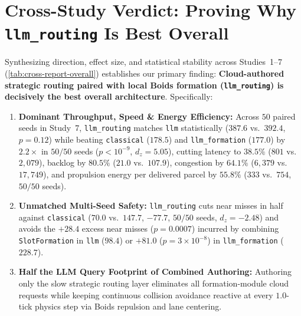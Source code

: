 \documentclass[11pt,a4paper,oneside]{report}
\begin{document}
\section[Why LLM Routing Wins Overall]{Cross-Study Verdict: Proving Why \texttt{llm\_routing} Is Best Overall}
Synthesizing direction, effect size, and statistical stability across Studies~1--7 (\autoref{tab:cross-report-overall}) establishes our primary finding: \textbf{Cloud-authored strategic routing paired with local Boids formation (\texttt{llm\_routing}) is decisively the best overall architecture}. Specifically:
\begin{enumerate}
    \item \textbf{Dominant Throughput, Speed \& Energy Efficiency:} Across $50$ paired seeds in Study~7, \texttt{llm\_routing} matches \texttt{llm} statistically ($387.6$ vs.\ $392.4$, $p=0.12$) while beating \texttt{classical} ($178.5$) and \texttt{llm\_formation} ($177.0$) by $2.2\times$ in $50/50$ seeds ($p<10^{-9}$, $d_z=5.05$), cutting latency to $38.5\%$ ($801$ vs.\ $2{,}079$), backlog by $80.5\%$ ($21.0$ vs.\ $107.9$), congestion by $64.1\%$ ($6{,}379$ vs.\ $17{,}749$), and propulsion energy per delivered parcel by $55.8\%$ ($333$ vs.\ $754$, $50/50$ seeds).
    \item \textbf{Unmatched Multi-Seed Safety:} \texttt{llm\_routing} cuts near misses in half against \texttt{classical} ($70.0$ vs.\ $147.7$, $-77.7$, $50/50$ seeds, $d_z=-2.48$) and avoids the $+28.4$ excess near misses ($p=0.0007$) incurred by combining \texttt{SlotFormation} in \texttt{llm} ($98.4$) or $+81.0$ ($p=3\times 10^{-8}$) in \texttt{llm\_formation} ($228.7$).
    \item \textbf{Half the LLM Query Footprint of Combined Authoring:} Authoring only the slow strategic routing layer eliminates all formation-module cloud requests while keeping continuous collision avoidance reactive at every $1.0$-tick physics step via Boids repulsion and lane centering.
\end{enumerate}
\end{document}
